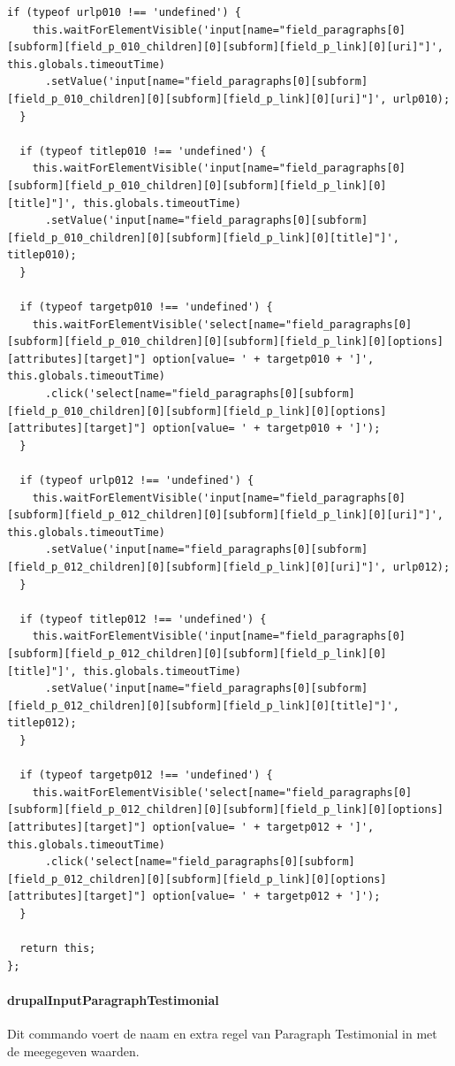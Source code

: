 \begin{lstlisting}[breaklines=true]
  if (typeof urlp010 !== 'undefined') {
    this.waitForElementVisible('input[name="field_paragraphs[0][subform][field_p_010_children][0][subform][field_p_link][0][uri]"]', this.globals.timeoutTime)
      .setValue('input[name="field_paragraphs[0][subform][field_p_010_children][0][subform][field_p_link][0][uri]"]', urlp010);
  }

  if (typeof titlep010 !== 'undefined') {
    this.waitForElementVisible('input[name="field_paragraphs[0][subform][field_p_010_children][0][subform][field_p_link][0][title]"]', this.globals.timeoutTime)
      .setValue('input[name="field_paragraphs[0][subform][field_p_010_children][0][subform][field_p_link][0][title]"]', titlep010);
  }

  if (typeof targetp010 !== 'undefined') {
    this.waitForElementVisible('select[name="field_paragraphs[0][subform][field_p_010_children][0][subform][field_p_link][0][options][attributes][target]"] option[value= ' + targetp010 + ']', this.globals.timeoutTime)
      .click('select[name="field_paragraphs[0][subform][field_p_010_children][0][subform][field_p_link][0][options][attributes][target]"] option[value= ' + targetp010 + ']');
  }

  if (typeof urlp012 !== 'undefined') {
    this.waitForElementVisible('input[name="field_paragraphs[0][subform][field_p_012_children][0][subform][field_p_link][0][uri]"]', this.globals.timeoutTime)
      .setValue('input[name="field_paragraphs[0][subform][field_p_012_children][0][subform][field_p_link][0][uri]"]', urlp012);
  }

  if (typeof titlep012 !== 'undefined') {
    this.waitForElementVisible('input[name="field_paragraphs[0][subform][field_p_012_children][0][subform][field_p_link][0][title]"]', this.globals.timeoutTime)
      .setValue('input[name="field_paragraphs[0][subform][field_p_012_children][0][subform][field_p_link][0][title]"]', titlep012);
  }

  if (typeof targetp012 !== 'undefined') {
    this.waitForElementVisible('select[name="field_paragraphs[0][subform][field_p_012_children][0][subform][field_p_link][0][options][attributes][target]"] option[value= ' + targetp012 + ']', this.globals.timeoutTime)
      .click('select[name="field_paragraphs[0][subform][field_p_012_children][0][subform][field_p_link][0][options][attributes][target]"] option[value= ' + targetp012 + ']');
  }

  return this;
};
\end{lstlisting}


\clearpage
\paragraph{drupalInputParagraphTestimonial}
\label{commando22}
Dit commando voert de naam en extra regel van Paragraph Testimonial in met de meegegeven waarden.
